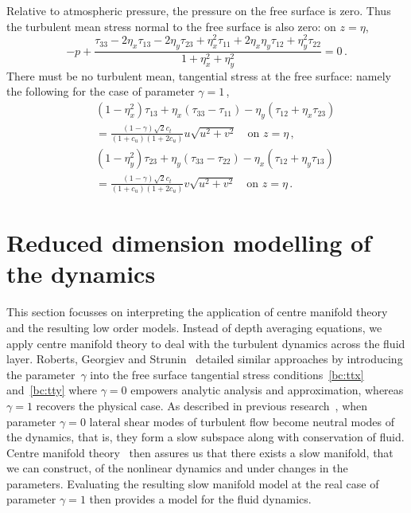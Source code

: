 \documentclass[a5paper,12pt]{article}
\begin{document}
Relative to atmospheric pressure, the pressure on the free surface is zero. 
Thus the turbulent mean stress normal to the free surface is also zero: on $z=\eta$,
\begin{equation}
    -p+\frac{\tau_{33} -2\eta_x\tau_{13} -2\eta_y\tau_{23}
    +\eta_x^2\tau_{11} +2\eta_x\eta_y\tau_{12}+\eta_y^2\tau_{22}}
    {1+\eta_x^2+\eta_y^2}
     =0\,.
    \label{bc:ttz}
\end{equation}
There must be no turbulent mean, tangential stress at the free surface: namely the following for the case of parameter $\gamma=1$\,,
\begin{eqnarray}&&
    (1-\eta_x^2)\tau_{13}+\eta_x(\tau_{33}-\tau_{11})
    -\eta_y(\tau_{12}+\eta_x\tau_{23})
    \nonumber\\&&{}
    = \frac{(1-\gamma)\sqrt2c_t}{(1+c_u)(1+2c_u)} u\sqrt{u^2+v^2}
    \quad\text{on } z=\eta\,,
    \label{bc:ttx}
    \\&&
    (1-\eta_y^2)\tau_{23}+\eta_y(\tau_{33}-\tau_{22})
    -\eta_x(\tau_{12}+\eta_y\tau_{13})
    \nonumber\\&&{}
    = \frac{(1-\gamma)\sqrt2c_t}{(1+c_u)(1+2c_u)} v\sqrt{u^2+v^2}
    \quad\text{on } z=\eta\,.
    \label{bc:tty}
\end{eqnarray}


\section{Reduced dimension modelling of the dynamics}

This section focusses on interpreting the application of centre manifold theory and the resulting low order models.
Instead of depth averaging equations, we apply centre manifold theory to deal with the turbulent dynamics across the fluid layer. 
Roberts, Georgiev and Strunin~\cite{Roberts2008, Georgiev2008} detailed similar approaches by introducing the parameter~$\gamma$ into the free surface tangential stress conditions~\eqref{bc:ttx} and~\eqref{bc:tty} where $\gamma=0$ empowers analytic analysis and approximation, whereas $\gamma=1$ recovers the physical case. 
As described in previous research~\cite{Roberts2008, Georgiev2008}, when parameter \(\gamma=0\) lateral shear modes of turbulent flow become neutral modes of the dynamics, that is, they form a slow subspace along with conservation of fluid.
Centre manifold theory~\cite[e.g.]{Vanderbauwhede88} then assures us that there exists a slow manifold, that we can construct, of the nonlinear dynamics and under changes in the parameters.
Evaluating the resulting slow manifold model at the real case of parameter \(\gamma=1\) then provides a model for the fluid dynamics.
 
\end{document}

